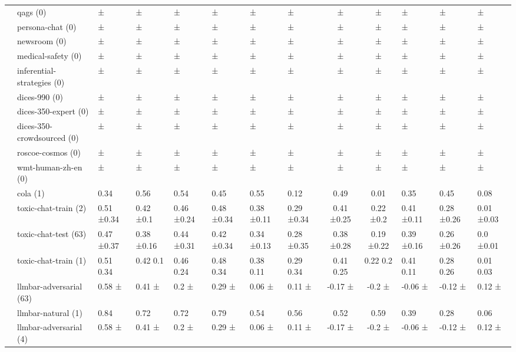 \begin{tabular}{llllllll|cc}
 & qags (0) &  ± &  ± &  ± &  ± &  ± &  ± &  ± &  ± &  ± &  ± &  ± \\
 & persona-chat (0) &  ± &  ± &  ± &  ± &  ± &  ± &  ± &  ± &  ± &  ± &  ± \\
 & newsroom (0) &  ± &  ± &  ± &  ± &  ± &  ± &  ± &  ± &  ± &  ± &  ± \\
 & medical-safety (0) &  ± &  ± &  ± &  ± &  ± &  ± &  ± &  ± &  ± &  ± &  ± \\
 & inferential-strategies (0) &  ± &  ± &  ± &  ± &  ± &  ± &  ± &  ± &  ± &  ± &  ± \\
 & dices-990 (0) &  ± &  ± &  ± &  ± &  ± &  ± &  ± &  ± &  ± &  ± &  ± \\
 & dices-350-expert (0) &  ± &  ± &  ± &  ± &  ± &  ± &  ± &  ± &  ± &  ± &  ± \\
 & dices-350-crowdsourced (0) &  ± &  ± &  ± &  ± &  ± &  ± &  ± &  ± &  ± &  ± &  ± \\
 & roscoe-cosmos (0) &  ± &  ± &  ± &  ± &  ± &  ± &  ± &  ± &  ± &  ± &  ± \\
 & wmt-human-zh-en (0) &  ± &  ± &  ± &  ± &  ± &  ± &  ± &  ± &  ± &  ± &  ± \\
 & cola (1) & 0.34  & 0.56  & 0.54  & 0.45  & 0.55  & 0.12  & 0.49  & 0.01  & 0.35  & 0.45  & 0.08  \\
 & toxic-chat-train (2) & 0.51 ±0.34 & 0.42 ±0.1 & 0.46 ±0.24 & 0.48 ±0.34 & 0.38 ±0.11 & 0.29 ±0.34 & 0.41 ±0.25 & 0.22 ±0.2 & 0.41 ±0.11 & 0.28 ±0.26 & 0.01 ±0.03 \\
 & toxic-chat-test (63) & 0.47 ±0.37 & 0.38 ±0.16 & 0.44 ±0.31 & 0.42 ±0.34 & 0.34 ±0.13 & 0.28 ±0.35 & 0.38 ±0.28 & 0.19 ±0.22 & 0.39 ±0.16 & 0.26 ±0.26 & 0.0 ±0.01 \\
 & toxic-chat-train (1) & 0.51 0.34 & 0.42 0.1 & 0.46 0.24 & 0.48 0.34 & 0.38 0.11 & 0.29 0.34 & 0.41 0.25 & 0.22 0.2 & 0.41 0.11 & 0.28 0.26 & 0.01 0.03 \\
 & llmbar-adversarial (63) & 0.58 ± & 0.41 ± & 0.2 ± & 0.29 ± & 0.06 ± & 0.11 ± & -0.17 ± & -0.2 ± & -0.06 ± & -0.12 ± & 0.12 ± \\
 & llmbar-natural (1) & 0.84  & 0.72  & 0.72  & 0.79  & 0.54  & 0.56  & 0.52  & 0.59  & 0.39  & 0.28  & 0.06  \\
 & llmbar-adversarial (4) & 0.58 ± & 0.41 ± & 0.2 ± & 0.29 ± & 0.06 ± & 0.11 ± & -0.17 ± & -0.2 ± & -0.06 ± & -0.12 ± & 0.12 ± \\

\end{tabular}

